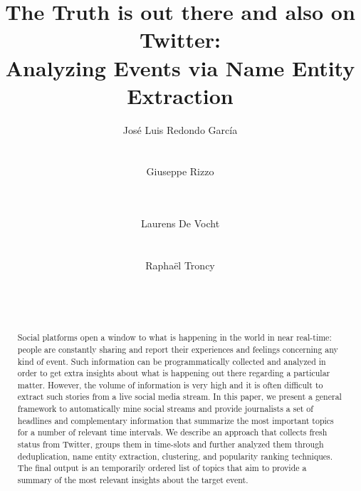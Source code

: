 \documentclass{sig-alternate}
\begin{document}
\title{The Truth is out there and also on Twitter: \\ Analyzing Events via Name Entity Extraction}

\author{
\alignauthor Jos\'e Luis Redondo Garc\'ia\\
	\\
	\\
\alignauthor Giuseppe Rizzo\\
	\\
	\\
\and
\alignauthor Laurens De Vocht\\
    \\
    \\
\alignauthor Rapha\"el Troncy\\
	\\
	\\
		\\
}

\maketitle


\begin{abstract}

Social platforms open a window to what is happening in the world in near real-time: people are constantly sharing and report their experiences and feelings concerning any kind of event. Such information can be programmatically collected and analyzed in order to get extra insights about what is happening out there regarding a particular matter. However, the volume of information is very high and it is often difficult to extract such stories from a live social media stream. In this paper, we present a general framework to automatically mine social streams and provide journalists a set of headlines and complementary information that summarize the most important topics for a number of relevant time intervals. We describe an approach that collects fresh status from Twitter, groups them in time-slots and further analyzed them through deduplication, name entity extraction,  clustering, and popularity ranking techniques. The final output is an temporarily ordered list of topics that aim to provide a summary of the most relevant insights about the target event. 

\end{abstract}
\end{document}

